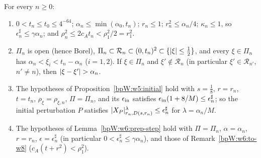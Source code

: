 \begin{lemma}\label{bpW:w8:shell-data}
For every $n\ge0$:
\begin{enumerate}[label=(\roman*)]
\item $0<t_n\le t_0\le4^{-64}$; $\alpha_n\le\min(\alpha_0,t_n)$; $r_n\le1$; $r_n^2\le\alpha_n/4$; $\kappa_n\le1$, so
  $\epsilon^\sharp_n\le\gamma\alpha_n$; and $\rho_n^2\le2c_At_n<\rho_1^2/2=r_1^2$.
\item $\Pi_n$ is open (hence Borel), $\Pi_n\subset\mathcal R_n\subset(0,t_n)^2\subset\{\lvert \xi\rvert\le\frac12\}$, and every
  $\xi\in\Pi_n$ has $\alpha_n<\xi_i<t_n-\alpha_n$ ($i=1,2$). If $\xi\in\Pi_n$ and $\xi'\notin\mathcal R_n$ (in
  particular $\xi'\in\mathcal R_{n'}$, $n'\ne n$), then $\lvert \xi-\xi'\rvert>\alpha_n$.
\item The hypotheses of Proposition~\ref{bpW:w5:initial} hold with $s=\frac18$, $r=r_n$, $t=t_n$,
  $\rho_\xi=\rho_{\xi,n}$, $\Pi=\Pi_n$, and its $\epsilon_{\rm in}$ satisfies $\epsilon_{\rm in}(1+8/M)\le\epsilon^\sharp_n$; so
  the initial perturbation $P$ satisfies $\lvert X_P\rvert^{\lambda}_{r_n,D(s,r_n)}\le\epsilon^\sharp_n$ for
  $\lambda=\alpha_n/M$.
\item The hypotheses of Lemma~\ref{bpW:w6:prep-step} hold with $\Pi=\Pi_n$, $\alpha=\alpha_n$, $r=r_n$,
  $\epsilon=\epsilon^\sharp_n$ (in particular $0<\epsilon^\sharp_n\le\gamma\alpha_n$), and those of Remark~\ref{bpW:w6:to-w8}
  ($c_A(t+r^2)<\rho_1^2$).
\end{enumerate}
\end{lemma}
